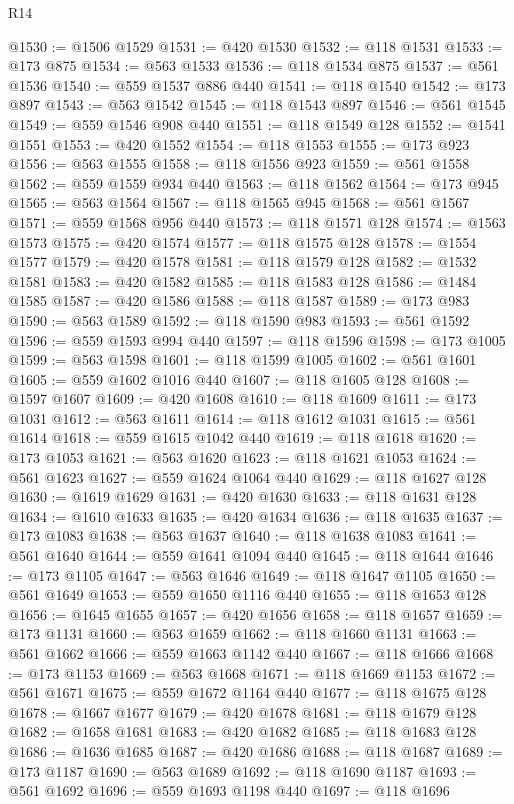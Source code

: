 \begin{lexlean}{R14}
\begin{coremodule}
{{{{{{{{{{{{{{{{{{{{{{{{{{{{{{{{{{{{{{{{{{{{{{{{{{{{{{{{{{{{{{{{{{{{{{{{{{{{{{{{{{@1530 := @1506 @1529
@1531 := @420 @1530
@1532 := @118 @1531
@1533 := @173 @875
@1534 := @563 @1533
@1536 := @118 @1534 @875
@1537 := @561 @1536
@1540 := @559 @1537 @886 @440
@1541 := @118 @1540
@1542 := @173 @897
@1543 := @563 @1542
@1545 := @118 @1543 @897
@1546 := @561 @1545
@1549 := @559 @1546 @908 @440
@1551 := @118 @1549 @128
@1552 := @1541 @1551
@1553 := @420 @1552
@1554 := @118 @1553
@1555 := @173 @923
@1556 := @563 @1555
@1558 := @118 @1556 @923
@1559 := @561 @1558
@1562 := @559 @1559 @934 @440
@1563 := @118 @1562
@1564 := @173 @945
@1565 := @563 @1564
@1567 := @118 @1565 @945
@1568 := @561 @1567
@1571 := @559 @1568 @956 @440
@1573 := @118 @1571 @128
@1574 := @1563 @1573
@1575 := @420 @1574
@1577 := @118 @1575 @128
@1578 := @1554 @1577
@1579 := @420 @1578
@1581 := @118 @1579 @128
@1582 := @1532 @1581
@1583 := @420 @1582
@1585 := @118 @1583 @128
@1586 := @1484 @1585
@1587 := @420 @1586
@1588 := @118 @1587
@1589 := @173 @983
@1590 := @563 @1589
@1592 := @118 @1590 @983
@1593 := @561 @1592
@1596 := @559 @1593 @994 @440
@1597 := @118 @1596
@1598 := @173 @1005
@1599 := @563 @1598
@1601 := @118 @1599 @1005
@1602 := @561 @1601
@1605 := @559 @1602 @1016 @440
@1607 := @118 @1605 @128
@1608 := @1597 @1607
@1609 := @420 @1608
@1610 := @118 @1609
@1611 := @173 @1031
@1612 := @563 @1611
@1614 := @118 @1612 @1031
@1615 := @561 @1614
@1618 := @559 @1615 @1042 @440
@1619 := @118 @1618
@1620 := @173 @1053
@1621 := @563 @1620
@1623 := @118 @1621 @1053
@1624 := @561 @1623
@1627 := @559 @1624 @1064 @440
@1629 := @118 @1627 @128
@1630 := @1619 @1629
@1631 := @420 @1630
@1633 := @118 @1631 @128
@1634 := @1610 @1633
@1635 := @420 @1634
@1636 := @118 @1635
@1637 := @173 @1083
@1638 := @563 @1637
@1640 := @118 @1638 @1083
@1641 := @561 @1640
@1644 := @559 @1641 @1094 @440
@1645 := @118 @1644
@1646 := @173 @1105
@1647 := @563 @1646
@1649 := @118 @1647 @1105
@1650 := @561 @1649
@1653 := @559 @1650 @1116 @440
@1655 := @118 @1653 @128
@1656 := @1645 @1655
@1657 := @420 @1656
@1658 := @118 @1657
@1659 := @173 @1131
@1660 := @563 @1659
@1662 := @118 @1660 @1131
@1663 := @561 @1662
@1666 := @559 @1663 @1142 @440
@1667 := @118 @1666
@1668 := @173 @1153
@1669 := @563 @1668
@1671 := @118 @1669 @1153
@1672 := @561 @1671
@1675 := @559 @1672 @1164 @440
@1677 := @118 @1675 @128
@1678 := @1667 @1677
@1679 := @420 @1678
@1681 := @118 @1679 @128
@1682 := @1658 @1681
@1683 := @420 @1682
@1685 := @118 @1683 @128
@1686 := @1636 @1685
@1687 := @420 @1686
@1688 := @118 @1687
@1689 := @173 @1187
@1690 := @563 @1689
@1692 := @118 @1690 @1187
@1693 := @561 @1692
@1696 := @559 @1693 @1198 @440
@1697 := @118 @1696
}}}}}}}}}}}}}}}}}}}}}}}}}}}}}}}}}}}}}}}}}}}}}}}}}}}}}}}}}}}}}}}}}}}}}}}}}}}}}}}}}}
\end{coremodule}
\end{lexlean}
